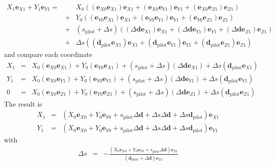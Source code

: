 \documentclass[12pt,a4paper,twoside,openright,BCOR10mm,headsepline,titlepage,abstracton,chapterprefix,final]{scrreprt}
\newcommand\Vector[1]{{\mathbf{#1}}}
\begin{document}
\begin{eqnarray}
  X_1 \Vector{e}_{X1} + Y_1 \Vector{e}_{Y1} 
  =&& 
      X_0 ( (\Vector{e}_{X0} \Vector{e}_{X1}) \Vector{e}_{X1} + (\Vector{e}_{X0} \Vector{e}_{Y1}) \Vector{e}_{Y1} + (\Vector{e}_{X0} \Vector{e}_{Z1} ) \Vector{e}_{Z1}) \nonumber \\
  &+& Y_0 ( (\Vector{e}_{Y0} \Vector{e}_{X1}) \Vector{e}_{X1} + (\Vector{e}_{Y0} \Vector{e}_{Y1}) \Vector{e}_{Y1} + (\Vector{e}_{Y0} \Vector{e}_{Z1} ) \Vector{e}_{Z1}) \nonumber \\  
  &+& (s_{\text{pilot}}+ \Delta s )( (\Delta \Vector{d} \Vector{e}_{X1}) \Vector{e}_{X1} + (\Delta \Vector{d} \Vector{e}_{Y1}) \Vector{e}_{Y1} + (\Delta \Vector{d} \Vector{e}_{Z1} ) \Vector{e}_{Z1}) \nonumber \\  
  &+& \Delta s ( (\Vector{d}_{\text{pilot}} \Vector{e}_{X1}) \Vector{e}_{X1} + (\Vector{d}_{\text{pilot}} \Vector{e}_{Y1}) \Vector{e}_{Y1} + (\Vector{d}_{\text{pilot}} \Vector{e}_{Z1} ) \Vector{e}_{Z1})  
\end{eqnarray}
and compare each coordinate
\begin{eqnarray}
  X_1 &=& X_0 (\Vector{e}_{X0} \Vector{e}_{X1}) + Y_0 (\Vector{e}_{Y0} \Vector{e}_{X1}) + (s_{\text{pilot}}+ \Delta s )(\Delta \Vector{d} \Vector{e}_{X1}) + \Delta s (\Vector{d}_{\text{pilot}} \Vector{e}_{X1}) \\
  Y_1 &=& X_0 (\Vector{e}_{X0} \Vector{e}_{Y1}) + Y_0 (\Vector{e}_{Y0} \Vector{e}_{Y1}) + (s_{\text{pilot}}+ \Delta s )(\Delta \Vector{d} \Vector{e}_{Y1}) + \Delta s (\Vector{d}_{\text{pilot}} \Vector{e}_{Y1}) \\
  0   &=& X_0 (\Vector{e}_{X0} \Vector{e}_{Z1}) + Y_0 (\Vector{e}_{Y0} \Vector{e}_{Z1}) + (s_{\text{pilot}}+ \Delta s )(\Delta \Vector{d} \Vector{e}_{Z1}) + \Delta s (\Vector{d}_{\text{pilot}} \Vector{e}_{Z1} )
\end{eqnarray}
The result is
\begin{eqnarray}
  X_1      &=& \left( X_0 \Vector{e}_{X0} + Y_0 \Vector{e}_{Y0} + s_{\text{pilot}}\Delta \Vector{d} + \Delta s \Delta \Vector{d} + \Delta s \Vector{d}_{\text{pilot}} \right) \Vector{e}_{X1} 
  \\
  Y_1      &=& \left( X_0 \Vector{e}_{X0} + Y_0 \Vector{e}_{Y0} + s_{\text{pilot}}\Delta \Vector{d} + \Delta s \Delta \Vector{d} + \Delta s \Vector{d}_{\text{pilot}} \right) \Vector{e}_{Y1} 
\end{eqnarray}
with
\begin{eqnarray}
  \Delta s &=& -\frac{ \left( X_0 \Vector{e}_{X0} + Y_0 \Vector{e}_{Y0} + s_{\text{pilot}} \Delta \Vector{d} \right) \Vector{e}_{Z1}}
                     { \left( \Vector{d}_{\text{pilot}} + \Delta \Vector{d} \right)\Vector{e}_{Z1}  }
\end{eqnarray}
\end{document}

